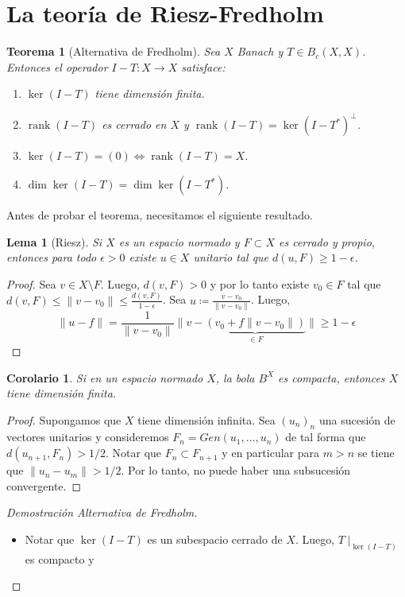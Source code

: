 \documentclass{article}
\newtheorem{Teorema}{Teorema}
\newtheorem{Lema}{Lema}
\newtheorem{Corolario}{Corolario}
\theoremstyle{plain}
\theoremstyle{definition}
\newcommand{\1}[1]{\mathbbm{1}\left( #1 \right)}
\DeclareMathOperator{\rank}{rank}
\newcommand{\norm}[1]{\lVert #1 \rVert}
\begin{document}
\section*{La teoría de Riesz-Fredholm}

\begin{Teorema}[Alternativa de Fredholm]
  Sea \(X\) Banach y \(T\in B_c(X,X)\).  Entonces el operador \(I-T\colon X \to X\) satisface:
  \begin{enumerate}
    \item \(\ker(I-T)\) tiene dimensión finita.
    \item \(\rank(I-T)\) es cerrado en \(X\) y \(\rank(I-T) = \ker(I-T^{\ast})^{\perp}\).
    \item \(\ker(I-T) = (0) \iff \rank(I-T) = X\).
    \item \(\dim \ker (I-T) = \dim \ker(I-T^{\ast})\). 
  \end{enumerate}
\end{Teorema}

Antes de probar el teorema, necesitamos el siguiente resultado.
\begin{Lema}[Riesz]
  Si \(X\) es un espacio normado y \(F\subset X\) es cerrado y propio, entonces 
  para todo \(\epsilon > 0\) existe \(u\in X\) unitario tal que \(d(u,F) \ge 1-\epsilon\).   
\end{Lema}
\begin{proof}
  Sea \(v\in X \setminus F\). Luego, \(d(v,F) > 0\) y por lo tanto existe \(v_0\in F\)
  tal que \(d(v,F) \le \norm{v-v_0} \le \frac{d(v,F)}{1-\epsilon}\). 
  Sea \(u\coloneqq \frac{v-v_0}{\norm{v-v_0}}\). Luego,
  \begin{displaymath}
    \norm{u-f}
    =
    \frac{1}{\norm{v-v_0}}
    \norm{v-\underbrace{(v_0+f\norm{v-v_0})}_{\in F}}
    \ge 1-\epsilon
  \end{displaymath}
\end{proof}

\begin{Corolario}
  Si en un espacio normado \(X\), la bola \(B^X\) es compacta, entonces \(X\) tiene dimensión finita.  
\end{Corolario}
\begin{proof}
  Supongamos que \(X\) tiene dimensión infinita. Sea \((u_n)_n\) una sucesión de vectores unitarios
  y consideremos \(F_{n} = Gen(u_1, \dots, u_n)\) de tal forma que \(d(u_{n+1}, F_n) > 1/2\).
  Notar que \(F_{n} \subset F_{n+1}\) y en particular para \(m>n\) se tiene que 
  \(\norm{u_n - u_m} > 1/2\). Por lo tanto, no puede haber una subsucesión convergente. 
\end{proof}

\begin{proof}[Demostración Alternativa de Fredholm]
\begin{itemize}
  \item Notar que \(\ker(I-T)\) es un subespacio cerrado de \(X\). Luego,
  \(T\mid_{\ker(I-T)}\) es compacto y 
\end{itemize}
\end{proof}
\end{document}
